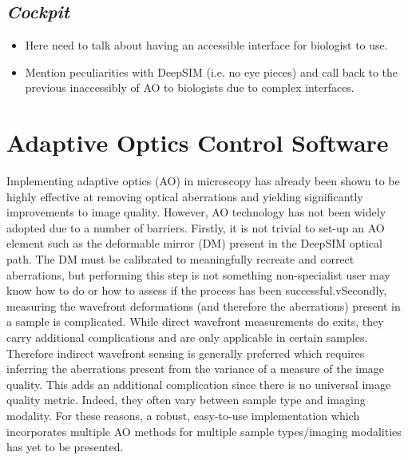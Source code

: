 	\subsection{\textit{Cockpit}}
	\label{subsec:cockpit}
	
	\begin{itemize}
		\item Here need to talk about having an accessible interface for biologist to use.
		\item Mention peculiarities with DeepSIM (i.e. no eye pieces) and call back to the previous inaccessibly of AO to biologists due to complex interfaces.
	\end{itemize}

\section{Adaptive Optics Control Software}
\label{sec:AOtools}

Implementing adaptive optics (AO) in microscopy has already been shown to be highly effective at removing optical aberrations and yielding significantly improvements to image quality.\cite{booth2014adaptive,girkin2009adaptive} However, AO technology has not been widely adopted due to a number of barriers. Firstly, it is not trivial to set-up an AO element such as the deformable mirror (DM) present in the DeepSIM optical path. The DM must be calibrated to meaningfully recreate and correct aberrations, but performing this step is not something non-specialist user may know how to do or how to assess if the process has been successful.vSecondly, measuring the wavefront deformations (and therefore the aberrations) present in a sample is complicated. While direct wavefront measurements do exits, they carry additional complications and are only applicable in certain samples.\cite{wang2014rapid,wang2015direct} Therefore indirect wavefront sensing is generally preferred which requires inferring the aberrations present from the variance of a measure of the image quality.\cite{rodriguez2018adaptive} This adds an additional complication since there is no universal image quality metric. Indeed, they often vary between sample type and imaging modality.\cite{burke2015adaptive,booth2002adaptive,fienup2003aberration,debarre2008adaptive} For these reasons, a robust, easy-to-use implementation which incorporates multiple AO methods for multiple sample types/imaging modalities has yet to be presented.\cite{ji2017adaptive}

